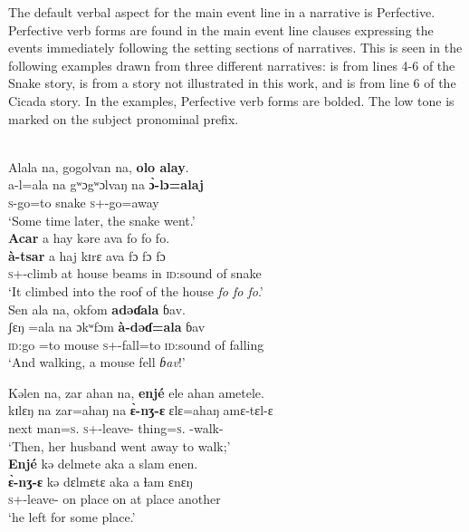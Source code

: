 The default verbal aspect for the main event line in a narrative is Perfective. Perfective verb forms are found in the main event line clauses expressing the events immediately following the setting sections of narratives. This is seen in the following examples drawn from three different narratives:  is from lines 4-6 of the Snake story,  is from a story not illustrated in this work, and  is from line 6 of the Cicada story. In the examples, Perfective verb forms are bolded. The low tone is marked on the subject pronominal prefix. 

\ea\label{ex:7:46}\\
Alala  na,  gogolvan  na,  \textbf{olo  alay}.\\ 
\gll a-l=ala        na gʷɔgʷɔlvaŋ   na         \textbf{\`{ɔ}-lɔ=alaj}\\
\textsc{s}-go=to {\PSP} snake   {\PSP}  {\textsc{s}+{\PFV}-go=away}\\
\glt ‘Some time later, the snake went.’\\
\medskip
 \textbf{Acar}  a  hay  kəre  ava fo fo fo.\\
\gll \textbf{à-tsar} a haj kɪrɛ ava {fɔ fɔ fɔ}\\
\textsc{s}+{\PFV}-climb       at   house   beams  in          {\textsc{id}:sound of snake}\\
\glt ‘It climbed into the roof of the house \textit{fo fo fo}.’\\
\medskip
Sen  ala  na, okfom  \textbf{adəɗala}  ɓav. \\
\gll ʃɛŋ  =ala na ɔkʷfɔm \textbf{à-dəɗ}\textbf{=ala} ɓav\\
\textsc{id}:go  =to      {\PSP}   mouse  \textsc{s}+{\PFV}-fall=to     {\textsc{id}:sound of falling} \\
\glt ‘And walking, a mouse fell \textit{ɓav}!’
\z

\ea\label{ex:7:47}
Kəlen  na,  zar  ahan  na,  \textbf{enjé}  ele  ahan  ametele.\\
\gll kɪlɛŋ   na  zar=ahaŋ    na  \textbf{\`ɛ{}-nʒ-ɛ}    ɛlɛ=ahaŋ        amɛ-tɛl-ɛ\\
next     {\PSP}  man=\textsc{s}.{\POSS}  {\PSP}  \textsc{s}+{\PFV}-leave-{\CL}  thing=\textsc{s}.{\POSS}  {\DEP}-walk-{\CL} \\
\glt ‘Then, her husband went away to walk;’\\
\medskip
\clearpage
\textbf{Enjé} kə  delmete  aka  a  slam  enen.\\
\gll \textbf{\`ɛ-nʒ-ɛ} kə dɛlmɛtɛ aka a ɬam ɛnɛŋ\\
\textsc{s}+{\PFV}-leave-{\CL}   on   place       on    at  place   another\\
\glt ‘he left for some place.’  
\z


